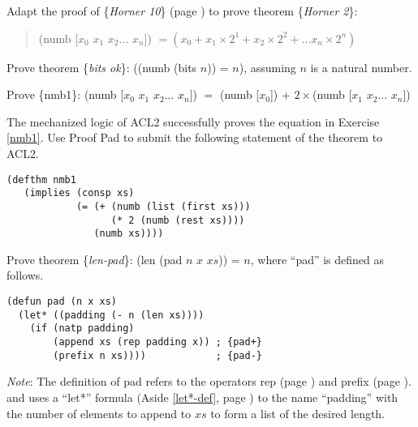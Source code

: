 \begin{ExerciseList}

\Exercise
\label{horner2-thm}
Adapt the proof of \{\emph{Horner 10}\} (page \pageref{horner10-thm})
to prove
theorem \{\emph{Horner 2}\}:
\begin{quote}
(numb [$x_0$ $x_1$ $x_2 \dots$ $x_{n}$])
$= (x_0 + x_1 \times 2^1 + x_2 \times 2^2 + \dots x_{n} \times 2^{n})$
\end{quote}

\Exercise \label{bits-ok}
Prove theorem \{\emph{bits ok}\}: ((numb (bits $n$)) = $n$), assuming $n$ is a natural number.

\Exercise \label{nmb1}
Prove \{nmb1\}: (numb [$x_0$ $x_1$ $x_2 \dots$ $x_{n}$]) $=$ (numb [$x_0$]) $+$ $2\times$(numb [$x_1$ $x_2 \dots$ $x_{n}$])

\Exercise \label{nmb1-acl2}
The mechanized logic of ACL2 successfully proves the equation in Exercise \ref{nmb1}.
Use Proof Pad to submit the following statement of the theorem to ACL2.
\begin{Verbatim}
(defthm nmb1
   (implies (consp xs)
            (= (+ (numb (list (first xs)))
                  (* 2 (numb (rest xs))))
               (numb xs))))
\end{Verbatim}

\Exercise Prove theorem \{\emph{len-pad}\}: (len (pad $n$ $x$ $xs$)) = $n$,
where ``pad'' is defined as follows. \\
\begin{samepage}
\label{pad-defun}
\begin{Verbatim}
(defun pad (n x xs)
  (let* ((padding (- n (len xs))))
    (if (natp padding)
        (append xs (rep padding x)) ; {pad+}
        (prefix n xs))))            ; {pad-}
\end{Verbatim}
\end{samepage}
\emph{Note}: The definition of pad refers to the operators
rep (page \pageref{rep-equations}) and prefix (page \pageref{prefix-equations}).
and uses a ``let*'' formula (Aside \ref{let*-def}, page \pageref{let*-def})
to the name ``padding'' with the number of elements to append to $xs$
to form a list of the desired length.


\end{ExerciseList}
